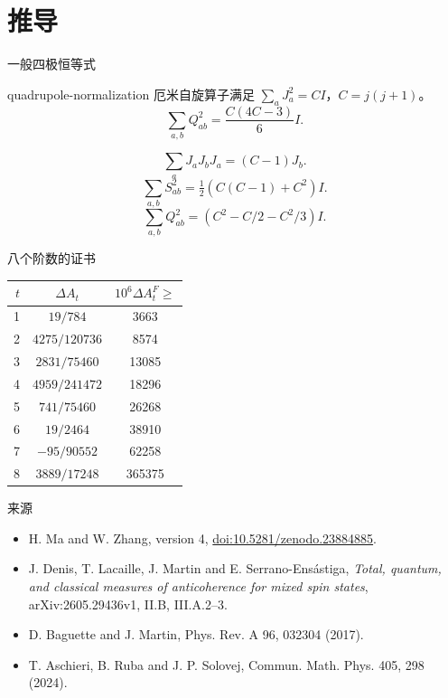 \documentclass{beamer}
\begin{document}
\section{推导}
\begin{frame}{一般四极恒等式}
\begin{bookresult}{quadrupole-normalization}
厄米自旋算子满足 $\sum_aJ_a^2=CI$，$C=j(j+1)$。
\[\sum_{a,b}Q_{ab}^2=\frac{C(4C-3)}6I.\]
\end{bookresult}
\[\sum_aJ_aJ_bJ_a=(C-1)J_b.\]
\[\sum_{a,b}S_{ab}^2=\tfrac12(C(C-1)+C^2)I.\]
\[\sum_{a,b}Q_{ab}^2=(C^2-C/2-C^2/3)I.\]
\end{frame}
\begin{frame}{八个阶数的证书}
\centering\small
\begin{tabular}{rcc}
$t$ & $\Delta A_t$ & $10^6\Delta A_t^F\geq$\\\hline
1 & $19/784$ & 3663\\
2 & $4275/120736$ & 8574\\
3 & $2831/75460$ & 13085\\
4 & $4959/241472$ & 18296\\
5 & $741/75460$ & 26268\\
6 & $19/2464$ & 38910\\
7 & $-95/90552$ & 62258\\
8 & $3889/17248$ & 365375
\end{tabular}
\end{frame}
\begin{frame}{来源}
\footnotesize
\begin{itemize}
\item H. Ma and W. Zhang, version 4, \href{https://doi.org/10.5281/zenodo.23884885}{doi:10.5281/zenodo.23884885}.
\item J. Denis, T. Lacaille, J. Martin and E. Serrano-Ens\'astiga, \emph{Total, quantum, and classical measures of anticoherence for mixed spin states}, arXiv:2605.29436v1, II.B, III.A.2--3.
\item D. Baguette and J. Martin, Phys. Rev. A 96, 032304 (2017).
\item T. Aschieri, B. Ruba and J. P. Solovej, Commun. Math. Phys. 405, 298 (2024).
\end{itemize}
\end{frame}
\FormalVerification
\end{document}
